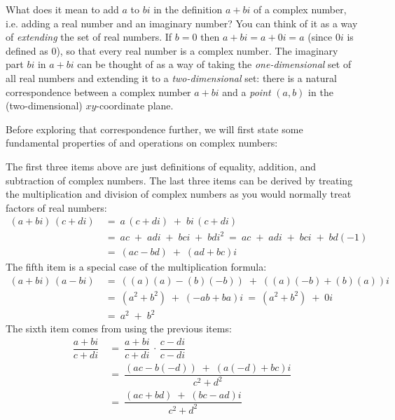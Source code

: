 What does it mean to add $a$ to $bi$ in the definition $a+bi$ of a complex number, i.e. adding a
real number and an imaginary number? You can think of it as a way of \emph{extending} the set of
real numbers. If $b=0$ then $a+bi = a+0i = a$ (since $0i$ is defined as $0$), so that every real
number is a complex number.
The imaginary part $bi$ in $a+bi$ can be thought of as a way of taking the \emph{one-dimensional}
set of all real numbers and extending it to a \emph{two-dimensional} set: there is a natural
correspondence between a complex number $a+bi$ and a \emph{point} $(a,b)$ in the
(two-dimensional) $xy$-coordinate plane.

Before exploring that correspondence further, we will first state some fundamental properties of
and operations on complex numbers:

\begin{center}\end{center}

The first three items above are just definitions of equality, addition, and subtraction of complex
numbers. The last three items can be derived by treating the multiplication and division of complex
numbers as you would normally treat factors of real numbers:
\begin{align*}
 (a+bi)\,(c+di) ~&=~ a\,(c+di) \;+\; bi\,(c+di)\\
 &=~ ac \;+\; adi \;+\; bci \;+\; bdi^2 ~=~ ac \;+\; adi \;+\; bci \;+\; bd(-1)\\
 &=~ (ac - bd) \;+\; (ad+bc)i
\end{align*}
\newpage
\noindent The fifth item is a special case of the multiplication formula:
\begin{align*}
 (a+bi)\,(a-bi) ~&=~ ((a)(a) - (b)(-b)) \;+\; ((a)(-b) + (b)(a))i\\
 &=~ ( a^2 + b^2 ) \;+\; (-ab + ba)i ~=~ ( a^2 + b^2 ) \;+\; 0i\\
 &=~ a^2 \;+\; b^2
\end{align*}
The sixth item comes from using the previous items:
\begin{align*}
 \dfrac{a+bi}{c+di} ~&=~ \dfrac{a+bi}{c+di} \,\cdot\, \dfrac{c-di}{c-di}\\
 &=~ \dfrac{(ac - b(-d)) \;+\; (a(-d) + bc)i}{c^2 + d^2}\\
 &=~ \dfrac{(ac+bd) \;+\; (bc-ad)i}{c^2 + d^2}
\end{align*}

